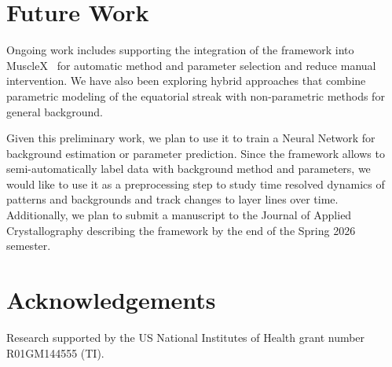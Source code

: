 \documentclass[11pt,onecolumn]{IEEEtran}
\begin{document}
\section{Future Work}


Ongoing work includes supporting the integration of the framework into MuscleX~\cite{JiratrakanvongEtAl2024,madhurapantula2026musclexdi} for automatic method and parameter selection and reduce manual intervention. We have also been exploring hybrid approaches that combine parametric modeling of the equatorial streak with non-parametric methods for general background.

Given this preliminary work, we plan to use it to train a Neural Network for background estimation or parameter prediction. Since the framework allows to semi-automatically label data with background method and parameters, we would like to use it as a preprocessing step to study time resolved dynamics of patterns and backgrounds and track changes to layer lines over time. Additionally, we plan to submit a manuscript to the Journal of Applied Crystallography describing the framework by the end of the Spring 2026 semester.



\section*{Acknowledgements}
Research supported by the US National Institutes of Health grant number R01GM144555 (TI).


% 
% 




% 
% 
\end{document}
